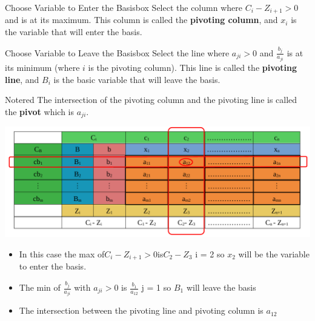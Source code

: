 \begin{prettyBox}{Choose Variable to Enter the Basis}{box}
    Select the column where \(C_i - Z_{i+1} > 0\) and is at its maximum. This column is called the 
\textbf{pivoting column}, and \(x_i\) is the variable that will enter the basis.
\end{prettyBox}

\vspace{0.35cm}

\begin{prettyBox}{Choose Variable to Leave the Basis}{box}
Select the line where \(a_{ji} > 0\) and \(\frac{b_j}{a_{ji}}\) is at its minimum (where \(i\) is the pivoting column). This line is called the \textbf{pivoting line}, and 
\(B_i\) is the basic variable that will leave the basis.
\end{prettyBox}
\vspace{0.35cm}
\begin{prettyBox}{Note}{red}
    The intersection of the pivoting column and the pivoting line is called the \textbf{pivot} which is \(a_{ji}\).
\end{prettyBox}

\vspace{0.35cm}
\begin{center}
    \includegraphics{Chapters/Simplexe/basis.pdf}
\end{center}

\begin{itemize}   
    \item In this case the max of\hspace{0.2cm}\(C_i - Z_{i+1} > 0\)\hspace{0.2cm}is\hspace{0.2cm}\(C_2 - Z_3\)\hspace{0.35cm} i = 2 so \(x_2\) 
will be the variable to enter the basis.
\item The min of \hspace{0.1cm}\(\frac{b_j}{a_{ji}}\)\hspace{0.1cm} with \(a_{ji} > 0\)\hspace{0.1cm} is \hspace{0.1cm} \(\frac{b_1}{a_{12}}\)\hspace{0.35cm} j = 1 so \(B_1\)
will leave the basis
\item The intersection between the pivoting line and pivoting column is \(a_{12}\)
 
\end{itemize}



